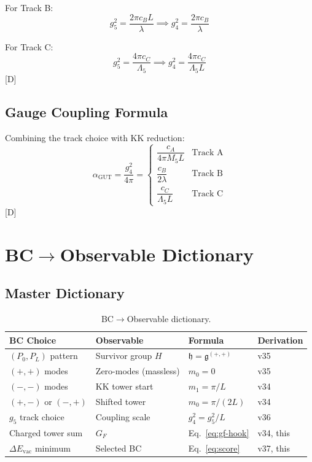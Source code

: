 \documentclass[11pt,a4paper]{article}
\newcommand{\tagD}{\textcolor{blue!70!black}{[D]}}
\begin{document}
For Track B:
\begin{equation}
\label{eq:track-B-relation}
g_5^2 = \frac{2\pi c_B L}{\lambda} \implies g_4^2 = \frac{2\pi c_B}{\lambda}
\end{equation}

For Track C:
\begin{equation}
\label{eq:track-C-relation}
g_5^2 = \frac{4\pi c_C}{\Lambda_5} \implies g_4^2 = \frac{4\pi c_C}{\Lambda_5 L}
\end{equation}
\tagD

\subsection{Gauge Coupling Formula}

Combining the track choice with KK reduction:
\begin{equation}
\label{eq:gauge-coupling-master}
\alpha_{\text{GUT}} = \frac{g_4^2}{4\pi} = \begin{cases}
\dfrac{c_A}{4\pi M_5 L} & \text{Track A} \\[1em]
\dfrac{c_B}{2\lambda} & \text{Track B} \\[1em]
\dfrac{c_C}{\Lambda_5 L} & \text{Track C}
\end{cases}
\end{equation}
\tagD

\section{BC$\to$Observable Dictionary}

\subsection{Master Dictionary}

\begin{table}[h]
\centering
\begin{tabular}{llll}
\toprule
BC Choice & Observable & Formula & Derivation \\
\midrule
$(P_0, P_L)$ pattern & Survivor group $H$ & $\mathfrak{h} = \mathfrak{g}^{(+,+)}$ & v35 \\
$(+,+)$ modes & Zero-modes (massless) & $m_0 = 0$ & v35 \\
$(-,-)$ modes & KK tower start & $m_1 = \pi/L$ & v34 \\
$(+,-)$ or $(-,+)$ & Shifted tower & $m_0 = \pi/(2L)$ & v34 \\
$g_5$ track choice & Coupling scale & $g_4^2 = g_5^2/L$ & v36 \\
Charged tower sum & $G_F$ & Eq.~\eqref{eq:gf-hook} & v34, this \\
$\Delta E_{\text{vac}}$ minimum & Selected BC & Eq.~\eqref{eq:score} & v37, this \\
\bottomrule
\end{tabular}
\caption{BC$\to$Observable dictionary.}
\label{tab:dictionary}
\end{table}
\end{document}
